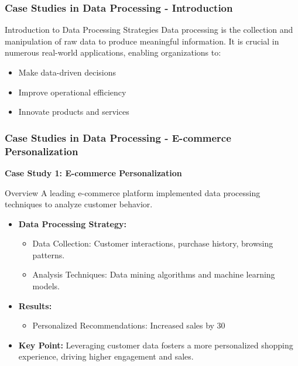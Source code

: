\documentclass[aspectratio=169]{beamer}
\begin{document}
\begin{frame}[fragile]
    \frametitle{Case Studies in Data Processing - Introduction}
    \begin{block}{Introduction to Data Processing Strategies}
        Data processing is the collection and manipulation of raw data to produce meaningful information. 
        It is crucial in numerous real-world applications, enabling organizations to:
    \end{block}
    \begin{itemize}
        \item Make data-driven decisions
        \item Improve operational efficiency
        \item Innovate products and services
    \end{itemize}
\end{frame}

\begin{frame}[fragile]
    \frametitle{Case Studies in Data Processing - E-commerce Personalization}
    \textbf{Case Study 1: E-commerce Personalization}
    
    \begin{block}{Overview}
        A leading e-commerce platform implemented data processing techniques to analyze customer behavior.
    \end{block}
    
    \begin{itemize}
        \item \textbf{Data Processing Strategy:}
        \begin{itemize}
            \item Data Collection: Customer interactions, purchase history, browsing patterns.
            \item Analysis Techniques: Data mining algorithms and machine learning models.
        \end{itemize}
        
        \item \textbf{Results:}
        \begin{itemize}
            \item Personalized Recommendations: Increased sales by 30%
        \end{itemize}
        
        \item \textbf{Key Point:} 
        Leveraging customer data fosters a more personalized shopping experience, driving higher engagement and sales.
    \end{itemize}
\end{frame}
\end{document}

